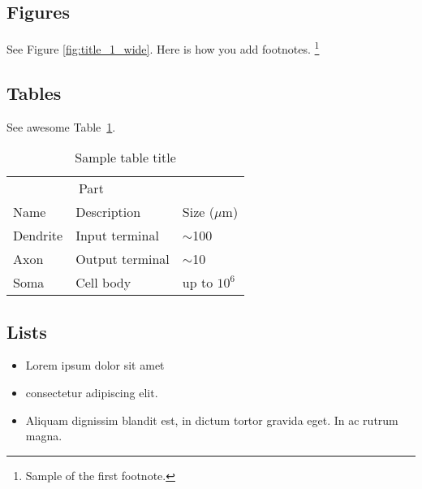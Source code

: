 \documentclass[12pt]{article}
\begin{document}
\subsection{Figures}
\lipsum[10] 
See Figure \ref{fig:title_1_wide}. Here is how you add footnotes. \footnote{Sample of the first footnote.}
\lipsum[11] 

\subsection{Tables}
\lipsum[12]
See awesome Table~\ref{tab:table}.

\begin{table}
 \caption{Sample table title}
  \centering
  \begin{tabular}{lll}
    \toprule
    \multicolumn{2}{c}{Part}                   \\
    \cmidrule(r){1-2}
    Name     & Description     & Size ($\mu$m) \\
    \midrule
    Dendrite & Input terminal  & $\sim$100     \\
    Axon     & Output terminal & $\sim$10      \\
    Soma     & Cell body       & up to $10^6$  \\
    \bottomrule
  \end{tabular}
  \label{tab:table}
\end{table}

\subsection{Lists}
\begin{itemize}
\item Lorem ipsum dolor sit amet
\item consectetur adipiscing elit. 
\item Aliquam dignissim blandit est, in dictum tortor gravida eget. In ac rutrum magna.
\end{itemize}


  


\end{document}

